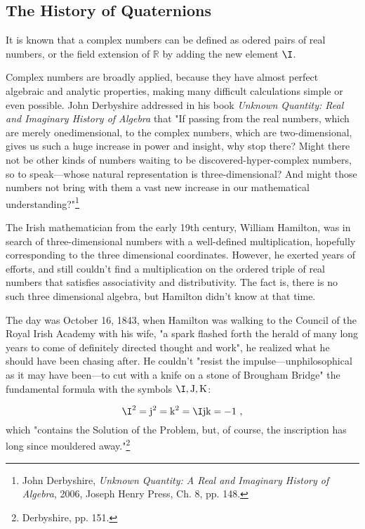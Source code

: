 

\subsection{The History of Quaternions}

It is known that a complex numbers can be defined as odered pairs of real numbers, or the field extension of $\mathbb{R}$ by adding the new element $\I$. 

Complex numbers are broadly applied, because they have almost perfect algebraic and analytic properties, making many difficult calculations simple or even possible. John Derbyshire addressed in his book \textsl{Unknown Quantity: Real and Imaginary History of Algebra} that "If passing from the real numbers, which are merely onedimensional, to the complex numbers, which are two-dimensional, gives us such a huge increase in power and insight, why stop there? Might there not be other kinds of numbers waiting to be discovered-hyper-complex numbers, so to speak—whose natural representation is three-dimensional? And might those numbers not bring with them a vast new increase in our mathematical understanding?"\footnote{John Derbyshire, \textsl{Unknown Quantity: A Real and Imaginary History of Algebra}, 2006, Joseph Henry Press, Ch. 8, pp. 148. }

The Irish mathematician from the early 19th century, William Hamilton, was in search of three-dimensional numbers with a well-defined multiplication, hopefully corresponding to the three dimensional coordinates. However, he exerted years of efforts, and still couldn't find a multiplication on the ordered triple of real numbers that satisfies associativity and distributivity. The fact is, there is no such three dimensional algebra, but Hamilton didn't know at that time. 


The day was October 16, 1843, when Hamilton was walking to the Council of the Royal Irish Academy with his wife, "a spark flashed forth the herald of many long years to come of definitely directed thought and work", he realized what he should have been chasing after. He couldn't "resist the impulse—unphilosophical as it may have been—to cut with a knife on a stone of Brougham Bridge" the fundamental formula with the symbols $\I, \mathrm{J}, \mathrm{K}$:

\begin{equation}
\I^2=\mathrm{j}^2=\mathrm{k}^2=\I\mathrm{j}\mathrm{k}=-1~,
\end{equation}
which "contains the Solution of the Problem, but, of course, the inscription
has long since mouldered away."\footnote{Derbyshire, pp. 151. }


